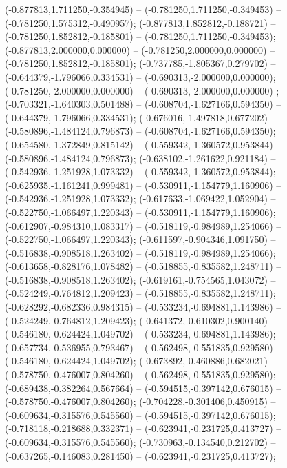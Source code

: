  (-0.877813,1.711250,-0.354945) -- (-0.781250,1.711250,-0.349453) -- (-0.781250,1.575312,-0.490957);
 (-0.877813,1.852812,-0.188721) -- (-0.781250,1.852812,-0.185801) -- (-0.781250,1.711250,-0.349453);
 (-0.877813,2.000000,0.000000) -- (-0.781250,2.000000,0.000000) -- (-0.781250,1.852812,-0.185801);
 (-0.737785,-1.805367,0.279702) -- (-0.644379,-1.796066,0.334531) -- (-0.690313,-2.000000,0.000000);
 (-0.781250,-2.000000,0.000000) -- (-0.690313,-2.000000,0.000000) ;
 (-0.703321,-1.640303,0.501488) -- (-0.608704,-1.627166,0.594350) -- (-0.644379,-1.796066,0.334531);
 (-0.676016,-1.497818,0.677202) -- (-0.580896,-1.484124,0.796873) -- (-0.608704,-1.627166,0.594350);
 (-0.654580,-1.372849,0.815142) -- (-0.559342,-1.360572,0.953844) -- (-0.580896,-1.484124,0.796873);
 (-0.638102,-1.261622,0.921184) -- (-0.542936,-1.251928,1.073332) -- (-0.559342,-1.360572,0.953844);
 (-0.625935,-1.161241,0.999481) -- (-0.530911,-1.154779,1.160906) -- (-0.542936,-1.251928,1.073332);
 (-0.617633,-1.069422,1.052904) -- (-0.522750,-1.066497,1.220343) -- (-0.530911,-1.154779,1.160906);
 (-0.612907,-0.984310,1.083317) -- (-0.518119,-0.984989,1.254066) -- (-0.522750,-1.066497,1.220343);
 (-0.611597,-0.904346,1.091750) -- (-0.516838,-0.908518,1.263402) -- (-0.518119,-0.984989,1.254066);
 (-0.613658,-0.828176,1.078482) -- (-0.518855,-0.835582,1.248711) -- (-0.516838,-0.908518,1.263402);
 (-0.619161,-0.754565,1.043072) -- (-0.524249,-0.764812,1.209423) -- (-0.518855,-0.835582,1.248711);
 (-0.628292,-0.682336,0.984315) -- (-0.533234,-0.694881,1.143986) -- (-0.524249,-0.764812,1.209423);
 (-0.641372,-0.610302,0.900140) -- (-0.546180,-0.624424,1.049702) -- (-0.533234,-0.694881,1.143986);
 (-0.657734,-0.536955,0.793467) -- (-0.562498,-0.551835,0.929580) -- (-0.546180,-0.624424,1.049702);
 (-0.673892,-0.460886,0.682021) -- (-0.578750,-0.476007,0.804260) -- (-0.562498,-0.551835,0.929580);
 (-0.689438,-0.382264,0.567664) -- (-0.594515,-0.397142,0.676015) -- (-0.578750,-0.476007,0.804260);
 (-0.704228,-0.301406,0.450915) -- (-0.609634,-0.315576,0.545560) -- (-0.594515,-0.397142,0.676015);
 (-0.718118,-0.218688,0.332371) -- (-0.623941,-0.231725,0.413727) -- (-0.609634,-0.315576,0.545560);
 (-0.730963,-0.134540,0.212702) -- (-0.637265,-0.146083,0.281450) -- (-0.623941,-0.231725,0.413727);
